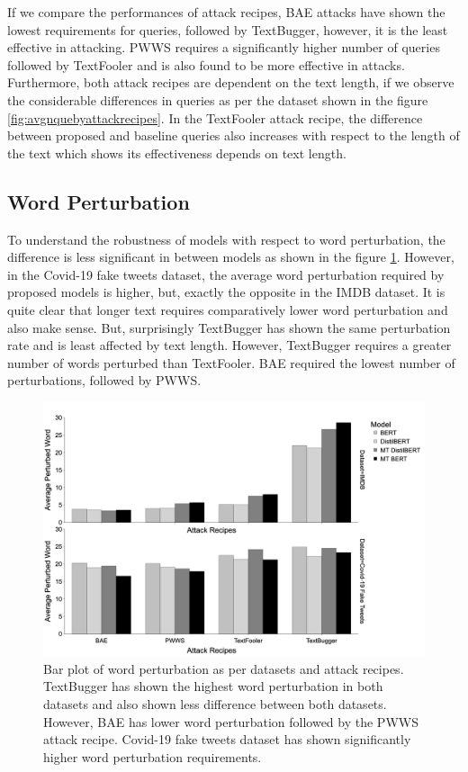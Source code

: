 \documentclass[%
	BCOR=8mm, %
	DIV=12,
	toc=bibliography, %
	toc=listof, %
	oneside, %
	egregdoesnotlikesansseriftitles, %
	]{scrbook}
\begin{document}
If we compare the performances of attack recipes, BAE attacks have shown the lowest requirements for queries, followed by TextBugger, however, it is the least effective in attacking. PWWS requires a significantly higher number of queries followed by TextFooler and is also found to be more effective in attacks. Furthermore, both attack recipes are dependent on the text length, if we observe the considerable differences in queries as per the dataset shown in the figure \ref{fig:avgnquebyattackrecipes}. In the TextFooler attack recipe, the difference between proposed and baseline queries also increases with respect to the length of the text which shows its effectiveness depends on text length. 
\subsection{Word Perturbation}
To understand the robustness of models with respect to word perturbation, the difference is less significant in between models as shown in the figure \ref{fig:avgpertbyattackrecipes}. However, in the Covid-19 fake tweets dataset, the average word perturbation required by proposed models is higher, but, exactly the opposite in the IMDB dataset. It is quite clear that longer text requires comparatively lower word perturbation and also make sense. But, surprisingly TextBugger has shown the same perturbation rate and is least affected by text length. However,  TextBugger requires a greater number of words perturbed than TextFooler. BAE required the lowest number of perturbations, followed by PWWS.
\begin{figure}[H]
    \centering
     \hspace*{2.5em}
    \includegraphics[width=0.80\linewidth]{img/AvgPertByDataset}
    \caption[Bar plot of word perturbation rate]{Bar plot of word perturbation as per datasets and attack recipes. TextBugger has shown the highest word perturbation in both datasets and also shown less difference between both datasets. However, BAE has lower word perturbation followed by the PWWS attack recipe. Covid-19 fake tweets dataset has shown significantly higher word perturbation requirements.  }
    \label{fig:avgpertbyattackrecipes}
\end{figure}
\end{document}
